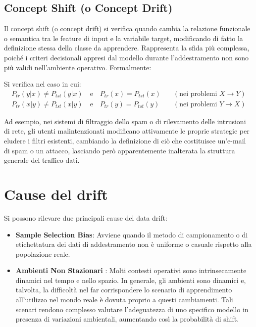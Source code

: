 \subsection{Concept Shift (o Concept Drift)}
Il concept shift (o concept drift) si verifica quando cambia la relazione funzionale o semantica tra le feature di input e la variabile target, modificando di fatto la definizione stessa della classe da apprendere. Rappresenta la sfida più complessa, poiché i criteri decisionali appresi dal modello durante l'addestramento non sono più validi nell'ambiente operativo.
Formalmente:
\begin{definition} Si verifica nel caso in cui:
	$$
		\begin{aligned} P_{tr}(y|x) \neq P_{tst}(y|x) \quad \text{e} \quad P_{tr}(x) = P_{tst}(x) & \quad (\text{nei problemi }X\rightarrow Y) \\ P_{tr}(x|y) \neq P_{tst}(x|y) \quad \text{e} \quad P_{tr}(y) = P_{tst}(y) & \quad (\text{nei problemi } Y \rightarrow X) \end{aligned}
	$$
\end{definition}
Ad esempio, nei sistemi di filtraggio dello spam o di rilevamento delle intrusioni di rete, gli utenti malintenzionati modificano attivamente le proprie strategie per eludere i filtri esistenti, cambiando la definizione di ciò che costituisce un'e-mail di spam o un attacco, lasciando però apparentemente inalterata la struttura generale del traffico dati.
\section{Cause del drift}
Si possono rilevare due principali cause del data drift:
\begin{itemize}
	\item \textbf{Sample Selection Bias}:
	Avviene quando il metodo di campionamento o di etichettatura dei dati di addestramento non è uniforme o casuale rispetto alla popolazione reale.
	\item \textbf{Ambienti Non Stazionari }: Molti contesti operativi sono intrinsecamente dinamici nel tempo e nello spazio. 
	In generale, gli ambienti sono dinamici e, talvolta, la difficoltà nel far corrispondere lo scenario di apprendimento all'utilizzo nel mondo reale è dovuta proprio a questi cambiamenti. Tali scenari rendono complesso valutare l'adeguatezza di uno specifico modello in presenza di variazioni ambientali, aumentando così la probabilità di shift.
	
\end{itemize}